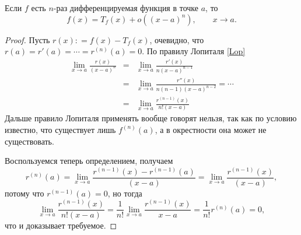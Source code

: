 \begin{theorem}
    Если $f$ есть $n$-раз дифференцируемая функция в точке $a$, то
    \[
     f(x) = T_f(x) + o((x-a)^n), \qquad x \to a.
    \]
\end{theorem}

\begin{proof}
    Пусть $r(x): = f(x) - T_f(x)$, очевидно, что $r(a) = r'(a) = \cdots = r^{(n)}(a) = 0$. По правилу Лопиталя \ref{Lop}
    \begin{eqnarray*}
        \lim_{x \to a} \frac{r(x)}{(x-a)^n} &=& \lim_{x \to a} \frac{r'(x)}{n(x-a)^{n-1}} \\
        &=& \lim_{x \to a} \frac{r''(x)}{n(n-1)(x-a)^{n-2}} = \cdots \\
        &=& \lim_{x \to a} \frac{r^{(n-1)}(x)}{n!(x-a)}
    \end{eqnarray*}
Дальше правило Лопиталя применять вообще говорят нельзя, так как по условию известно, что существует лишь $f^{(n)}(a)$, а в окрестности она может не существовать. 

Воспользуемся теперь определением, получаем
\[
 r^{(n)}(a) = \lim_{x \to a} \frac{r^{(n-1)}(x) - r^{(n-1)}(a)}{(x-a)} = \lim_{x \to a} \frac{r^{(n-1)}(x)}{(x-a)},
\]
потому что $r^{(n-1)}(a) = 0$, но тогда
\[
 \lim_{x \to a} \frac{r^{(n-1)}(x)}{n!(x-a)} = \frac{1}{n!}\lim_{x \to a} \frac{r^{(n-1)}(x)}{x-a} = \frac{1}{n!} r^{(n)}(a)= 0,
\]
что и доказывает требуемое.
\end{proof}

